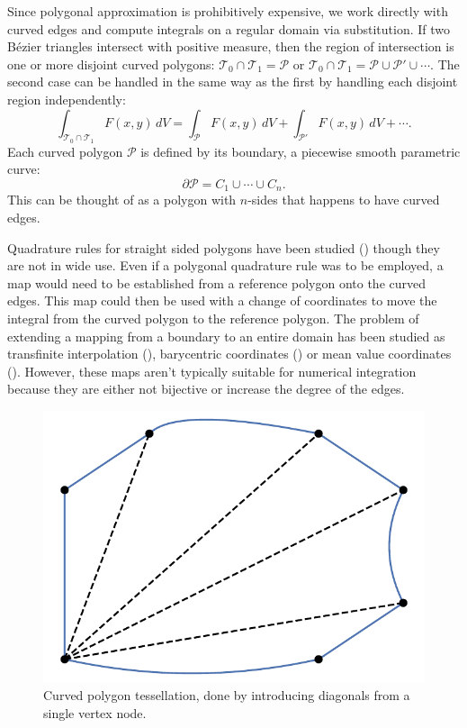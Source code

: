 Since polygonal approximation is prohibitively expensive,
we work directly with curved edges and compute integrals on a regular
domain via substitution.
If two B\'{e}zier triangles intersect with positive measure, then
the region of intersection is one or more disjoint curved polygons:
\(\mathcal{T}_0 \cap \mathcal{T}_1 = \mathcal{P}\) or
\(\mathcal{T}_0 \cap \mathcal{T}_1 = \mathcal{P} \cup
\mathcal{P}' \cup \cdots\).
The second case can be handled in the same way as the first by handling each
disjoint region independently:
\begin{equation}
\int_{\mathcal{T}_0 \cap \mathcal{T}_1} F(x, y) \, dV =
  \int_{\mathcal{P}} F(x, y) \, dV +
  \int_{\mathcal{P}'} F(x, y) \, dV + \cdots.
\end{equation}
Each curved polygon \(\mathcal{P}\) is defined by its boundary, a
piecewise smooth parametric curve:
\begin{equation}
\partial \mathcal{P} = C_1 \cup \cdots \cup C_n.
\end{equation}
This can be thought of as a polygon with \(n\)-sides that happens to
have curved edges.

Quadrature rules for straight sided polygons have been
studied (\cite{Mousavi2009}) though they are not in wide use. Even
if a polygonal quadrature rule was to be employed, a map would need to be
established from a reference polygon onto the curved edges. This map
could then be used with a change of coordinates to move the integral
from the curved polygon to the reference polygon. The problem of extending
a mapping from a boundary to an entire domain has been studied as
transfinite interpolation
(\cite{chenin:tel-00284680, Gordon1982, Perronnet1998}),
barycentric coordinates (\cite{Wachspress1975}) or mean value coordinates
(\cite{Floater2003}). However, these maps aren't typically suitable for
numerical integration because they are either not bijective or increase the
degree of the edges.

\begin{figure}
  \includegraphics{../images/solution-transfer/main_figure11.pdf}
  \centering
  \captionsetup{width=.75\linewidth}
  \caption{Curved polygon tessellation, done by introducing diagonals
    from a single vertex node.}
  \label{fig:tessellated-curved-polygon}
\end{figure}

